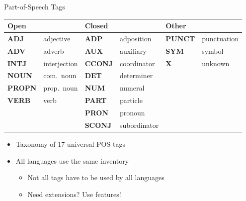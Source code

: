 \documentclass[10pt, compress, aspectratio=169]{beamer}
\newcommand{\upos}[1]{\textbf{\color{blue}#1}}
\begin{document}
\begin{frame}{Part-of-Speech Tags}
\begin{tabular}{ll|ll|ll}
\multicolumn{2}{l|}{\textbf{Open}} & \multicolumn{2}{l|}{\textbf{Closed}} & \multicolumn{2}{l}{\textbf{Other}} \\\hline
\upos{ADJ}   & adjective    & \upos{ADP}   & adposition & \upos{PUNCT} & punctuation \\
\upos{ADV}   & adverb       & \upos{AUX}   & auxiliary    & \upos{SYM}   & symbol \\
\upos{INTJ}  & interjection & \upos{CCONJ} & coordinator  & \upos{X}     & unknown \\
\upos{NOUN}  & com.~noun    & \upos{DET}   & determiner   &       & \\
\upos{PROPN} & prop.~noun   & \upos{NUM}   & numeral      &       & \\
\upos{VERB}  & verb         & \upos{PART}  & particle     &       & \\
             &              & \upos{PRON}  & pronoun      &       & \\
             &              & \upos{SCONJ} & subordinator &       & \\
\end{tabular}

\bigskip
\begin{itemize}
\item Taxonomy of 17 universal POS tags
\item All languages use the same inventory
\begin{itemize}
\item Not all tags have to be used by all languages
\item Need extensions? Use features!
\end{itemize}
\end{itemize}
\end{frame}
\end{document}
